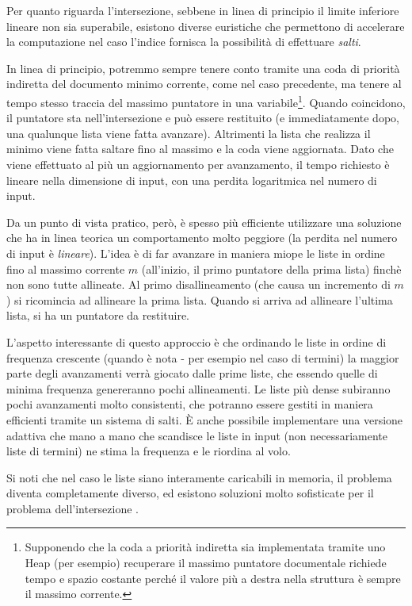 Per quanto riguarda l'intersezione, sebbene in linea di principio il limite inferiore lineare non sia superabile, esistono diverse euristiche che permettono di accelerare la computazione nel caso l'indice fornisca la possibilità di effettuare \textit{salti}.

In linea di principio, potremmo sempre tenere conto tramite una coda di priorità indiretta del documento minimo corrente, come nel caso precedente, ma tenere al tempo stesso traccia del massimo puntatore in una variabile\footnote{Supponendo che la coda a priorità indiretta sia implementata tramite uno Heap (per esempio) recuperare il massimo puntatore documentale richiede tempo e spazio costante perché il valore più a destra nella struttura è sempre il massimo corrente.}. Quando coincidono, il puntatore sta nell'intersezione e può essere restituito (e immediatamente dopo, una qualunque lista viene fatta avanzare). Altrimenti la lista che realizza il minimo viene fatta saltare fino al massimo e la coda viene aggiornata. Dato che viene effettuato al più un aggiornamento per avanzamento, il tempo richiesto è lineare nella dimensione di input, con una perdita logaritmica nel numero di input.

Da un punto di vista pratico, però, è spesso più efficiente utilizzare una soluzione che ha in linea teorica un comportamento molto peggiore (la perdita nel numero di input è \textit{lineare}). L'idea è di far avanzare in maniera miope le liste in ordine fino al massimo corrente $m$ (all'inizio, il primo puntatore della prima lista) finchè non sono tutte allineate. Al primo disallineamento (che causa un incremento di $m$) si ricomincia ad allineare la prima lista. Quando si arriva ad allineare l'ultima lista, si ha un puntatore da restituire.

L'aspetto interessante di questo approccio è che ordinando le liste in ordine di frequenza crescente (quando è nota - per esempio nel caso di termini) la maggior parte degli avanzamenti verrà giocato dalle prime liste, che essendo quelle di minima frequenza genereranno pochi allineamenti. Le liste più dense subiranno pochi avanzamenti molto consistenti, che potranno essere gestiti in maniera efficienti tramite un sistema di salti. È anche possibile implementare una versione adattiva che mano a mano che scandisce le liste in input (non necessariamente liste di termini) ne stima la frequenza e le riordina al volo.

Si noti che nel caso le liste siano interamente caricabili in memoria, il problema diventa completamente diverso, ed esistono soluzioni molto sofisticate per il problema dell'intersezione \cite{intersection}.

